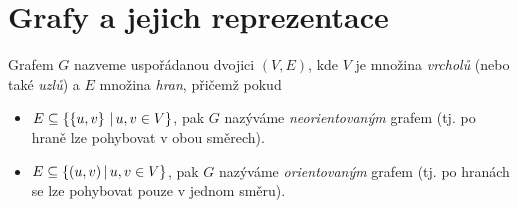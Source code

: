 \section{Grafy a jejich reprezentace}\label{sec:grafy}

\begin{definition}[Graf]
    Grafem $G$ nazveme uspořádanou dvojici $(V, E)$, kde $V$ je množina \emph{vrcholů} (nebo také \emph{uzlů}) a $E$ množina \emph{hran}, přičemž pokud
    \begin{itemize}
        \item $E\subseteq\left\{\left\{u,v\right\}\,|\,u,v\in V\right\}$, pak $G$ nazýváme \emph{neorientovaným} grafem (tj. po hraně lze pohybovat v obou směrech).
        \item $E\subseteq\left\{(u,v)\,|\,u,v\in V\right\}$, pak $G$ nazýváme \emph{orientovaným} grafem (tj. po hranách se lze pohybovat pouze v jednom směru).
    \end{itemize}
\end{definition}